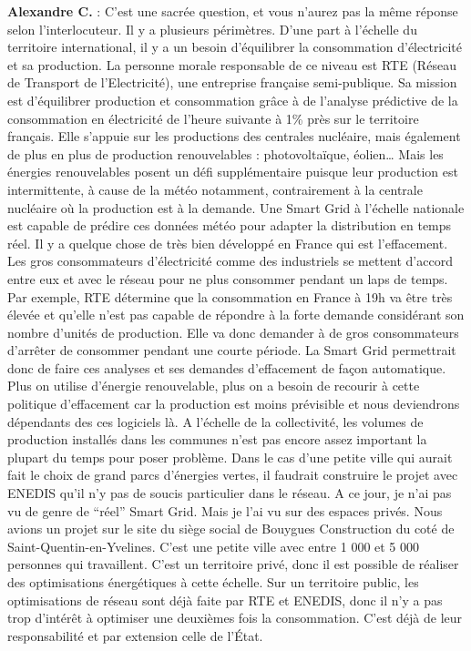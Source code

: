 \textbf{Alexandre C.} :
C’est une sacrée question, et vous n’aurez pas la même réponse selon l’interlocuteur.
Il y a plusieurs périmètres.
D’une part à l’échelle du territoire international, il y a un besoin d’équilibrer la consommation d’électricité et sa production.
La personne morale responsable de ce niveau est RTE (Réseau de Transport de l’Electricité), une entreprise française semi-publique.
Sa mission est d’équilibrer production et consommation grâce à de l’analyse prédictive de la consommation en électricité
de l’heure suivante à 1\% près sur le territoire français.
Elle s’appuie sur les productions des centrales nucléaire, mais également de plus en plus de production renouvelables : photovoltaïque, éolien\dots
Mais les énergies renouvelables posent un défi supplémentaire puisque leur production est intermittente,
à cause de la météo notamment, contrairement à la centrale nucléaire où la production est à la demande.
Une Smart Grid à l’échelle nationale est capable de prédire ces données météo pour adapter la distribution en temps réel.
Il y a quelque chose de très bien développé en France qui est l’effacement.
Les gros consommateurs d'électricité comme des industriels se mettent d’accord entre eux et avec le réseau
pour ne plus consommer pendant un laps de temps.
Par exemple, RTE détermine que la consommation en France à 19h va être très élevée
et qu’elle n’est pas capable de répondre à la forte demande considérant son nombre d’unités de production.
Elle va donc demander à de gros consommateurs d’arrêter de consommer pendant une courte période.
La Smart Grid permettrait donc de faire ces analyses et ses demandes d’effacement de façon automatique.
Plus on utilise d’énergie renouvelable, plus on a besoin de recourir à cette politique d’effacement
car la production est moins prévisible et nous deviendrons dépendants des ces logiciels là.
A l'échelle de la collectivité, les volumes de production installés dans les communes
n’est pas encore assez important la plupart du temps pour poser problème.
Dans le cas d’une petite ville qui aurait fait le choix de grand parcs d’énergies vertes,
il faudrait construire le projet avec ENEDIS qu’il n’y pas de soucis particulier dans le réseau.
A ce jour, je n’ai pas vu de genre de “réel” Smart Grid.
Mais je l’ai vu sur des espaces privés.
Nous avions un projet sur le site du siège social de Bouygues Construction du coté de Saint-Quentin-en-Yvelines.
C’est une petite ville avec entre 1 000 et 5 000 personnes qui travaillent.
C’est un territoire privé, donc il est possible de réaliser des optimisations énergétiques à cette échelle.
Sur un territoire public, les optimisations de réseau sont déjà faite par RTE et ENEDIS,
donc il n’y a pas trop d'intérêt à optimiser une deuxièmes fois la consommation.
C’est déjà de leur responsabilité et par extension celle de l’État.

